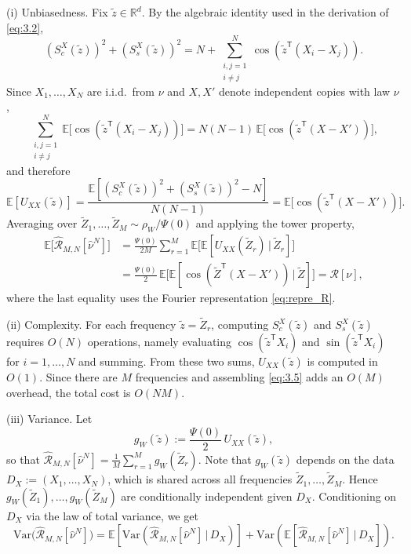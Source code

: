 \documentclass[11pt,leqno]{article}
\theoremstyle{plain}
\theoremstyle{remark}
\theoremstyle{definition}
\numberwithin{equation}{section}
\numberwithin{figure}{section}
\numberwithin{table}{section}
\numberwithin{algorithm}{section}
\newcommand{\EE}{\mathbb{E}}
\newcommand{\RR}{\mathbb{R}}
\begin{document}
\noindent
(i) Unbiasedness.
Fix $\tilde z\in\RR^d$.
By the algebraic identity used in the derivation of \eqref{eq:3.2},
\[
 (S_c^X(\tilde z))^2 + (S_s^X(\tilde z))^2
 = N + \sum_{\substack{i,j=1\\i\neq j}}^N\cos(\tilde z^{\mathsf{T}}(X_i-X_j)).
\]
Since $X_1,\ldots,X_N$ are i.i.d.\ from $\nu$ and $X,X'$ denote independent copies with law $\nu$,
\[
 \sum_{\substack{i,j=1\\i\neq j}}^N\EE\bigl[\cos(\tilde z^{\mathsf{T}}(X_i-X_j))\bigr]
 = N(N-1)\,\EE\bigl[\cos(\tilde z^{\mathsf{T}}(X-X'))\bigr],
\]
and therefore
\begin{equation}\label{eq:6.UXX_W}
 \EE[U_{XX}(\tilde z)]
 = \frac{\EE[(S_c^X(\tilde z))^2+(S_s^X(\tilde z))^2-N]}{N(N-1)}
 = \EE\bigl[\cos(\tilde z^{\mathsf{T}}(X-X'))\bigr].
\end{equation}
Averaging over $\tilde Z_1,\ldots,\tilde Z_M\sim\rho_W/\Psi(0)$ and applying the tower property,
\begin{align*}
 \EE\bigl[\hat{\mathcal{R}}_{M,N}[\hat\nu^N]\bigr]
 &= \frac{\Psi(0)}{2M}\sum_{r=1}^M
    \EE\bigl[\EE[U_{XX}(\tilde Z_r)\,|\,\tilde Z_r]\bigr] \\
 &= \frac{\Psi(0)}{2}\,\EE\bigl[\EE[\cos(\tilde Z^{\mathsf{T}}(X-X'))\,|\,\tilde Z]\bigr]
 = \mathcal{R}[\nu],
\end{align*}
where the last equality uses the Fourier representation \eqref{eq:repre_R}.

\medskip\noindent
(ii) Complexity.
For each frequency $\tilde z=\tilde Z_r$, computing $S_c^X(\tilde z)$ and $S_s^X(\tilde z)$ requires $O(N)$ operations,
namely evaluating $\cos(\tilde z^{\mathsf{T}}X_i)$ and $\sin(\tilde z^{\mathsf{T}}X_i)$ for $i=1,\ldots,N$ and summing.
From these two sums, $U_{XX}(\tilde z)$ is computed in $O(1)$.
Since there are $M$ frequencies and assembling \eqref{eq:3.5} adds an $O(M)$ overhead,
the total cost is $O(NM)$.

\medskip\noindent
(iii) Variance.
Let
\[
 g_W(\tilde z) := \frac{\Psi(0)}{2}\,U_{XX}(\tilde z),
\]
so that $\hat{\mathcal{R}}_{M,N}[\hat\nu^N]=\frac{1}{M}\sum_{r=1}^M g_W(\tilde Z_r)$.
Note that $g_W(\tilde z)$ depends on the data $D_X:=(X_1,\ldots,X_N)$,
which is shared across all frequencies $\tilde Z_1,\ldots,\tilde Z_M$.
Hence $g_W(\tilde Z_1),\ldots,g_W(\tilde Z_M)$ are conditionally independent given $D_X$.
Conditioning on $D_X$ via the law of total variance, we get
\begin{equation}\label{eq:6.var_W}
 \mathrm{Var}\bigl(\hat{\mathcal{R}}_{M,N}[\hat\nu^N]\bigr)
 = \EE\!\left[\mathrm{Var}\!\left(\hat{\mathcal{R}}_{M,N}[\hat\nu^N]\,|\,D_X\right)\right]
 + \mathrm{Var}\!\left(\EE\!\left[\hat{\mathcal{R}}_{M,N}[\hat\nu^N]\,|\,D_X\right]\right).
\end{equation}
\end{document}
